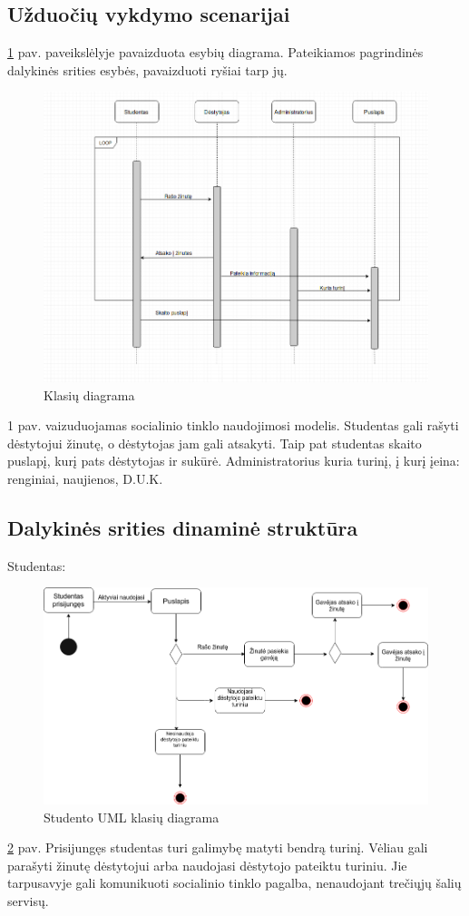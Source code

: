 \documentclass{VUMIFPSkursinis}
\begin{document}
\subsection{Užduočių vykdymo scenarijai}
\ref{fig:klasiu} pav. paveikslėlyje pavaizduota esybių diagrama. Pateikiamos pagrindinės dalykinės srities esybės, pavaizduoti ryšiai tarp jų.
\begin{figure}[H]
\centering
\includegraphics[width=\linewidth]{img/bendra-uml.png}
\caption{Klasių diagrama}
\label{fig:klasiu}
\end{figure}
1 pav. vaizuduojamas socialinio tinklo naudojimosi modelis. Studentas gali rašyti dėstytojui žinutę, o dėstytojas jam gali atsakyti. Taip pat studentas skaito puslapį, kurį pats dėstytojas ir sukūrė. Administratorius kuria turinį, į kurį įeina: renginiai, naujienos, D.U.K.
\subsection{Dalykinės srities dinaminė struktūra}
Studentas:
\begin{figure}[H]
\centering
\includegraphics[width=\linewidth]{img/studentas.png}
\caption{Studento UML klasių diagrama}
\label{fig:studentu}
\end{figure}
\ref{fig:studentu} pav. Prisijungęs studentas turi galimybę matyti bendrą turinį. Vėliau gali parašyti žinutę dėstytojui arba naudojasi dėstytojo pateiktu turiniu. Jie tarpusavyje gali komunikuoti socialinio tinklo pagalba, nenaudojant trečiųjų šalių servisų.
\newpage
\end{document}
